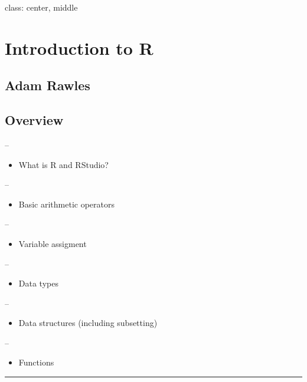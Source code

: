 \documentclass[]{article}
\title{}
\author{}
\date{}
\providecommand{\tightlist}{%
  \setlength{\itemsep}{0pt}\setlength{\parskip}{0pt}}
\begin{document}
class: center, middle

\hypertarget{introduction-to-r}{%
\section{Introduction to R}\label{introduction-to-r}}

\hypertarget{adam-rawles}{%
\subsection{Adam Rawles}\label{adam-rawles}}

\hypertarget{overview}{%
\subsection{Overview}\label{overview}}

--

\begin{itemize}
\tightlist
\item
  What is R and RStudio?
\end{itemize}

--

\begin{itemize}
\tightlist
\item
  Basic arithmetic operators
\end{itemize}

--

\begin{itemize}
\tightlist
\item
  Variable assigment
\end{itemize}

--

\begin{itemize}
\tightlist
\item
  Data types
\end{itemize}

--

\begin{itemize}
\tightlist
\item
  Data structures (including subsetting)
\end{itemize}

--

\begin{itemize}
\tightlist
\item
  Functions
\end{itemize}

\begin{center}\rule{0.5\linewidth}{\linethickness}\end{center}
\end{document}
